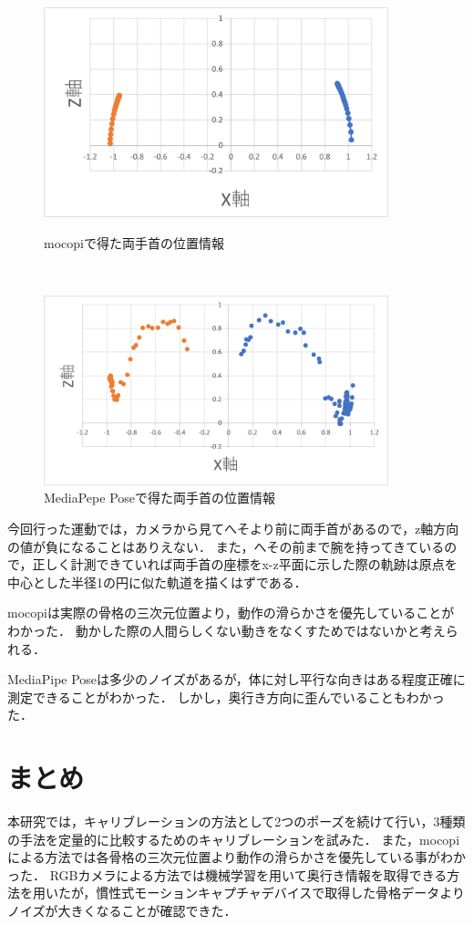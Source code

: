 \documentclass[a4j, fleqn, 12pt]{jsreport}
\begin{document}
\begin{figure}[h]
  \centering
  \begin{minipage}{10cm}
    \centering
    \includegraphics[width=10cm]{img/1_mocopi.png}
    \caption{mocopiで得た両手首の位置情報}
    \label{fig:1_mocopi}
  \end{minipage}\\
  \begin{minipage}{10cm}
    \centering
    \includegraphics[width=10cm]{img/1_media.png}
    \caption{MediaPepe Poseで得た両手首の位置情報}
    \label{fig:1_media}
  \end{minipage}
\end{figure}
今回行った運動では，カメラから見てへそより前に両手首があるので，z軸方向の値が負になることはありえない．
また，へその前まで腕を持ってきているので，正しく計測できていれば両手首の座標をx-z平面に示した際の軌跡は原点を中心とした半径1の円に似た軌道を描くはずである．

mocopiは実際の骨格の三次元位置より，動作の滑らかさを優先していることがわかった．
動かした際の人間らしくない動きをなくすためではないかと考えられる．

MediaPipe Poseは多少のノイズがあるが，体に対し平行な向きはある程度正確に測定できることがわかった．
しかし，奥行き方向に歪んでいることもわかった．
\chapter{まとめ}
本研究では，キャリブレーションの方法として2つのポーズを続けて行い，3種類の手法を定量的に比較するためのキャリブレーションを試みた．
また，mocopiによる方法では各骨格の三次元位置より動作の滑らかさを優先している事がわかった．
RGBカメラによる方法では機械学習を用いて奥行き情報を取得できる方法を用いたが，慣性式モーションキャプチャデバイスで取得した骨格データよりノイズが大きくなることが確認できた．
\end{document}

